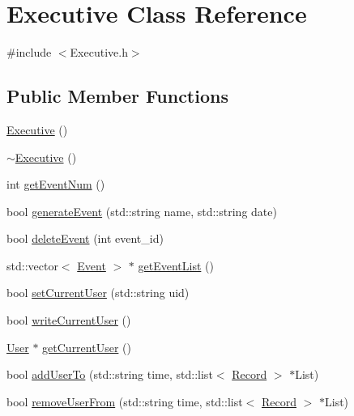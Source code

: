\hypertarget{class_executive}{}\section{Executive Class Reference}
\label{class_executive}


{\ttfamily \#include $<$Executive.\+h$>$}

\subsection*{Public Member Functions}
\begin{DoxyCompactItemize}
\item 
\mbox{\hyperlink{class_executive_ad870c1d741f1f313eb0c5a8336f8af6b}{Executive}} ()
\item 
\mbox{\hyperlink{class_executive_a4ce80c499f7640b1770ade77cf56d965}{$\sim$\+Executive}} ()
\item 
int \mbox{\hyperlink{class_executive_abd540db75256c14b7fe16d59c0e00d48}{get\+Event\+Num}} ()
\item 
bool \mbox{\hyperlink{class_executive_a0b1e894fc41ed42482896aff46a7a520}{generate\+Event}} (std\+::string name, std\+::string date)
\item 
bool \mbox{\hyperlink{class_executive_a14c76414b43a4149728afc38613b8cee}{delete\+Event}} (int event\+\_\+id)
\item 
std\+::vector$<$ \mbox{\hyperlink{class_event}{Event}} $>$ $\ast$ \mbox{\hyperlink{class_executive_ab8fa8f11ea8794947da209d295c7e8fd}{get\+Event\+List}} ()
\item 
bool \mbox{\hyperlink{class_executive_a8010517a6dd4bbe81ce4a03a91886931}{set\+Current\+User}} (std\+::string uid)
\item 
bool \mbox{\hyperlink{class_executive_a5879f0c70a947b199113f1d707c53610}{write\+Current\+User}} ()
\item 
\mbox{\hyperlink{class_user}{User}} $\ast$ \mbox{\hyperlink{class_executive_a12621ad5db6ee3f111779a61ea82bba7}{get\+Current\+User}} ()
\item 
bool \mbox{\hyperlink{class_executive_a59e947ff980f9bd1ef0bb9ea8dae42b1}{add\+User\+To}} (std\+::string time, std\+::list$<$ \mbox{\hyperlink{class_record}{Record}} $>$ $\ast$List)
\item 
bool \mbox{\hyperlink{class_executive_a1df250bced0d7d74ce5017cd1a225e4d}{remove\+User\+From}} (std\+::string time, std\+::list$<$ \mbox{\hyperlink{class_record}{Record}} $>$ $\ast$List)
\item 

\end{DoxyCompactItemize}
